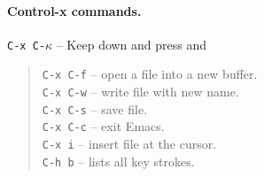 \documentclass[a4paper,12pt]{book}
\begin{document}
\paragraph{Control-x commands.} \verb|C-x C-|$\kappa$ -- Keep 
down and press  and  \keys{$\kappa$}
\begin{quote}
	\verb|C-x C-f| -- open a file into a new buffer.\\
	\verb|C-x C-w| -- write file with new name.\\
	\verb|C-x C-s| -- save file.\\
	\verb|C-x C-c| -- exit Emacs.\\
	\verb|C-x i| -- insert file at the cursor.\\
	\verb|C-h b| -- lists all key strokes.\\
\end{quote}
\end{document}
